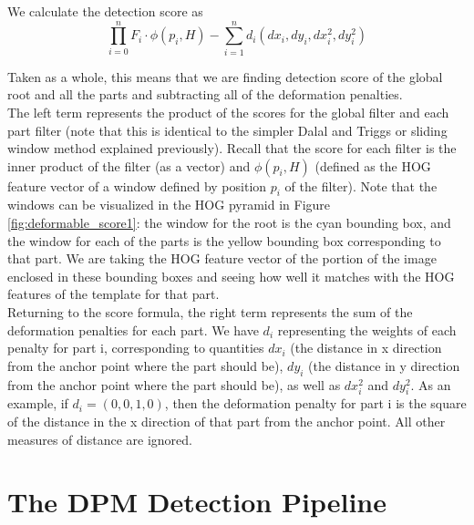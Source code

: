 \documentclass{article}
\begin{document}
We calculate the detection score as 
$$\prod_{i=0}^{n}F_i \cdot \phi(p_i,H) - \sum_{i=1}^{n}d_i(dx_i,dy_i,dx_i^2, dy_i^2)$$

Taken as a whole, this means that we are finding detection score of the global root and 
all the parts and subtracting all of the deformation penalties.\\

The left term represents the product of the
scores for the global filter and each
part filter (note that this is identical to the simpler Dalal and Triggs \cite{hog_human_detection} or sliding
window method explained previously).
Recall that the score for each filter is
the inner product of the filter (as a vector) and $\phi(p_i,H)$ (defined as
the HOG feature vector of a window defined by position $p_i$ of the filter). Note
that the windows can be visualized in the HOG pyramid in Figure 
\ref{fig:deformable_score1}: the window for the root is the cyan bounding box, and the window
for each of the parts is the yellow bounding box corresponding to that part. We are taking
the HOG feature vector of the portion of the image enclosed in these bounding boxes and seeing how well it matches with the HOG features of the template for that part.\\

Returning to the score formula, the right term represents the sum of the 
deformation penalties for each part.
We have $d_i$ representing the weights of each penalty for part i, corresponding to quantities
$dx_i$ (the distance in x direction from the anchor point where the part should be), 
$dy_i$ (the distance in y direction from the anchor point where the part should be), as 
well as $dx_i^2$ and $dy_i^2$. As an example, if $d_i = (0, 0, 1, 0)$, then the 
deformation penalty for part i is the square of the distance in the x direction of
that part from the anchor point. All other measures of distance are ignored.\\

\section{The DPM Detection Pipeline}
\end{document}
